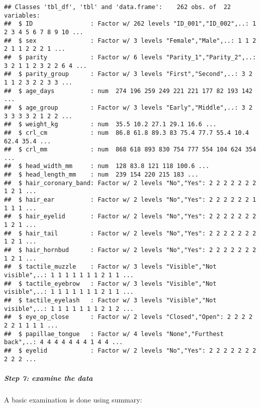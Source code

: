 \documentclass[
]{article}
\newenvironment{Shaded}{\begin{snugshade}}{\end{snugshade}}
\newcommand{\KeywordTok}[1]{\textcolor[rgb]{0.13,0.29,0.53}{\textbf{#1}}}
\newcommand{\NormalTok}[1]{#1}
\newcommand{\OperatorTok}[1]{\textcolor[rgb]{0.81,0.36,0.00}{\textbf{#1}}}
\newcommand{\StringTok}[1]{\textcolor[rgb]{0.31,0.60,0.02}{#1}}
\begin{document}
\begin{verbatim}
## Classes 'tbl_df', 'tbl' and 'data.frame':    262 obs. of  22 variables:
##  $ ID                : Factor w/ 262 levels "ID_001","ID_002",..: 1 2 3 4 5 6 7 8 9 10 ...
##  $ sex               : Factor w/ 3 levels "Female","Male",..: 1 1 2 2 1 1 2 2 2 1 ...
##  $ parity            : Factor w/ 6 levels "Parity_1","Parity_2",..: 3 2 1 1 2 3 2 2 6 4 ...
##  $ parity_group      : Factor w/ 3 levels "First","Second",..: 3 2 1 1 2 3 2 2 3 3 ...
##  $ age_days          : num  274 196 259 249 221 221 177 82 193 142 ...
##  $ age_group         : Factor w/ 3 levels "Early","Middle",..: 3 2 3 3 3 3 2 1 2 2 ...
##  $ weight_kg         : num  35.5 10.2 27.1 29.1 16.6 ...
##  $ crl_cm            : num  86.8 61.8 89.3 83 75.4 77.7 55.4 10.4 62.4 35.4 ...
##  $ crl_mm            : num  868 618 893 830 754 777 554 104 624 354 ...
##  $ head_width_mm     : num  128 83.8 121 118 100.6 ...
##  $ head_length_mm    : num  239 154 220 215 183 ...
##  $ hair_coronary_band: Factor w/ 2 levels "No","Yes": 2 2 2 2 2 2 2 1 2 1 ...
##  $ hair_ear          : Factor w/ 2 levels "No","Yes": 2 2 2 2 2 2 1 1 1 1 ...
##  $ hair_eyelid       : Factor w/ 2 levels "No","Yes": 2 2 2 2 2 2 2 1 2 1 ...
##  $ hair_tail         : Factor w/ 2 levels "No","Yes": 2 2 2 2 2 2 2 1 2 1 ...
##  $ hair_hornbud      : Factor w/ 2 levels "No","Yes": 2 2 2 2 2 2 2 1 2 1 ...
##  $ tactile_muzzle    : Factor w/ 3 levels "Visible","Not visible",..: 1 1 1 1 1 1 1 2 1 1 ...
##  $ tactile_eyebrow   : Factor w/ 3 levels "Visible","Not visible",..: 1 1 1 1 1 1 1 2 1 1 ...
##  $ tactile_eyelash   : Factor w/ 3 levels "Visible","Not visible",..: 1 1 1 1 1 1 1 2 1 2 ...
##  $ eye_op_close      : Factor w/ 2 levels "Closed","Open": 2 2 2 2 2 2 1 1 1 1 ...
##  $ papillae_tongue   : Factor w/ 4 levels "None","Furthest back",..: 4 4 4 4 4 4 4 1 4 4 ...
##  $ eyelid            : Factor w/ 2 levels "No","Yes": 2 2 2 2 2 2 2 2 2 2 ...
\end{verbatim}

\hypertarget{step-7-examine-the-data}{%
\subparagraph{Step 7: examine the data}\label{step-7-examine-the-data}}

A basic examination is done using summary:

\begin{Shaded}
\end{Shaded}
\end{document}
